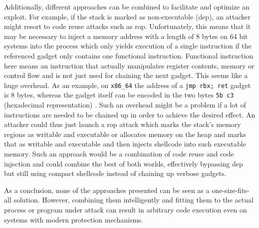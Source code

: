 Additionally, different approaches can be combined to facilitate and optimize an exploit.
For example, if the stack is marked as non-executable (\gls{dep}), an attacker might resort to code reuse attacks such as \gls{rop}.
Unfortunately, this means that it may be necessary to inject a memory address with a length of 8 bytes on 64 bit systems into the process which only yields execution of a single instruction if the referenced gadget only contains one functional instruction.
Functional instruction here means an instruction that actually manipulates register contents, memory or control flow and is not just used for chaining the next gadget.
This seems like a huge overhead.
As an example, on \texttt{x86\_64} the address of a \texttt{jmp rbx; ret} gadget is 8 bytes, whereas the gadget itself can be encoded in the two bytes \texttt{5b c3} (hexadecimal representation) \cite[3-2\psq,4-390,4-555]{IntelCorporation2020}.
Such an overhead might be a problem if a lot of instructions are needed to be chained up in order to achieve the desired effect.
An attacker could thus just launch a \gls{rop} attack which marks the stack's memory regions as writable and executable or allocates memory on the heap and marks that as writable and executable and then injects shellcode into such executable memory.
Such an approach would be a combination of code reuse and code injection and could combine the best of both worlds, effectively bypassing \gls{dep} but still using compact shellcode instead of chaining up verbose gadgets.

As a conclusion, none of the approaches presented can be seen as a one-size-fits-all solution.
However, combining them intelligently and fitting them to the actual process or program under attack can result in arbitrary code execution even on systems with modern protection mechanisms.
